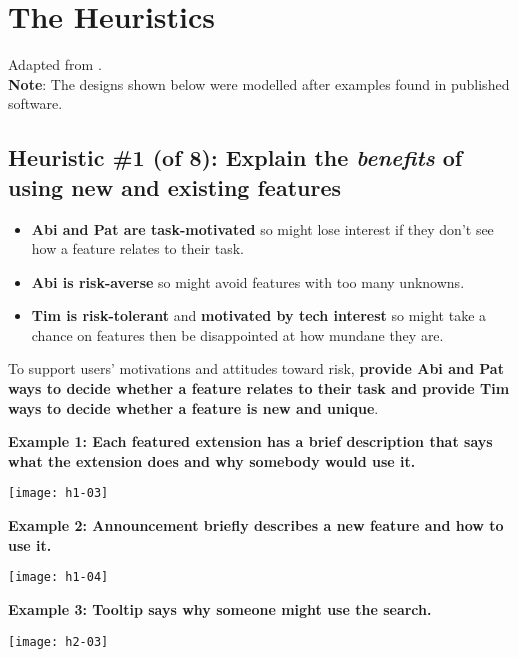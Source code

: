 \section{The Heuristics}

Adapted from \parencite{burnett2021heuristics}.\\

\noindent\textbf{Note}: The designs shown below were modelled after examples found in published software.

\subsection{Heuristic \#1 (of 8): Explain the \textit{benefits} of using new and existing features}

\begin{itemize}
\item \textbf{Abi and Pat are task-motivated} so might lose interest if they don't see how a feature relates to their task.
\item \textbf{Abi is risk-averse} so might avoid features with too many unknowns.
\item \textbf{Tim is risk-tolerant} and \textbf{motivated by tech interest} so might take a chance on features then be disappointed at how mundane they are.
\end{itemize}

\noindent To support users' motivations and attitudes toward risk, \textbf{provide Abi and Pat ways to decide whether a feature relates to their task and provide Tim ways to decide whether a feature is new and unique}.

\spacer
\noindent\textbf{Example 1: Each featured extension has a brief description that says what the extension does and why somebody would use it.}
\begin{center}
\noindent\texttt{[image: h1-03]}
\end{center}

\noindent\textbf{Example 2: Announcement briefly describes a new feature and how to use it.}
\begin{center}
\noindent\texttt{[image: h1-04]}
\end{center}

\noindent\textbf{Example 3: Tooltip says why someone might use the search.}
\begin{center}
\noindent\texttt{[image: h2-03]}
\end{center}

